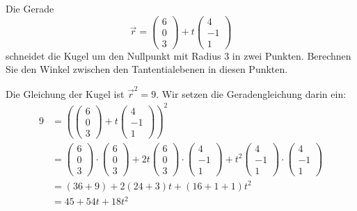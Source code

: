 Die Gerade
\[
\vec r
=
\begin{pmatrix}6\\0\\3\end{pmatrix}
+t
\begin{pmatrix}4\\-1\\1\end{pmatrix}
\]
schneidet die Kugel um den Nullpunkt mit Radius $3$ in zwei Punkten.
Berechnen Sie den Winkel zwischen den Tantentialebenen in diesen
Punkten.

\begin{loesung}
Die Gleichung der Kugel ist $\vec r^2=9$. Wir setzen die Geradengleichung
darin ein:
\begin{align*}
9&=\left(
\begin{pmatrix}6\\0\\3\end{pmatrix}+t\begin{pmatrix}4\\-1\\1\end{pmatrix}
\right)^2
\\
&=
\begin{pmatrix}6\\0\\3\end{pmatrix}
\cdot
\begin{pmatrix}6\\0\\3\end{pmatrix}
+2t
\begin{pmatrix}6\\0\\3\end{pmatrix}
\cdot
\begin{pmatrix}4\\-1\\1\end{pmatrix}
+t^2
\begin{pmatrix}4\\-1\\1\end{pmatrix}
\cdot
\begin{pmatrix}4\\-1\\1\end{pmatrix}
\\
&=(36+9)+2(24+3)t+(16+1+1)t^2\\
&=45+54t+18t^2
\\

\end{align*}
\end{loesung}
